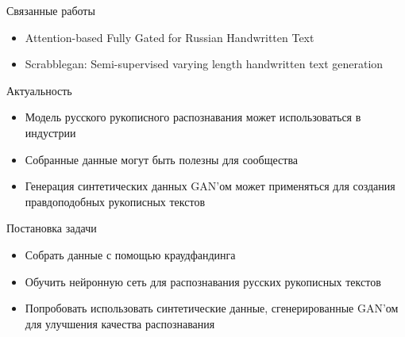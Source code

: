 \documentclass[fleqn, xcolor=x11names]{beamer}
\begin{document}
\begin{frame}{Связанные работы}
    \begin{itemize}
        \item Attention-based Fully Gated for Russian Handwritten Text \cite{CNN-BGRU}
        \item Scrabblegan: Semi-supervised varying length handwritten text generation \cite{scrabble_gan}
    \end{itemize}

\end{frame}




\begin{frame}{Актуальность}
    \begin{itemize}
        \item Модель русского рукописного распознавания может использоваться
        в индустрии
        \item Собранные данные могут быть полезны для сообщества
        \item Генерация синтетических данных GAN'ом может применяться
        для создания правдоподобных рукописных текстов
    \end{itemize}
\end{frame}


\begin{frame}{Постановка задачи}
    \begin{itemize}
        \item Собрать данные с помощью краудфандинга 
        \item Обучить нейронную сеть для распознавания
        русских рукописных текстов
        \item Попробовать использовать синтетические данные, 
        сгенерированные GAN'ом для улучшения качества распознавания

    \end{itemize}
\end{frame}

\end{document}

